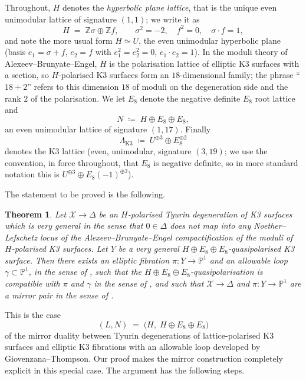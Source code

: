 \documentclass[11pt]{article}
\newtheorem{theorem}{Theorem}[section]
\newcommand{\X}{\mathcal{X}}
\newcommand{\D}{\Delta}
\newcommand{\PP}{\mathbb{P}}
\newcommand{\bZ}{\mathbb{Z}}
\begin{document}
Throughout, $H$ denotes the \emph{hyperbolic plane lattice}, that is the
unique even unimodular lattice of signature $(1,1)$; we write it as
\[
H \;=\; \bZ\sigma \oplus \bZ f,\qquad
\sigma^2 = -2,\quad f^2=0,\quad \sigma\cdot f = 1,
\]
and note the more usual form $H\simeq U$, the even unimodular hyperbolic
plane (basis $e_1 = \sigma+f$, $e_2 = f$ with $e_1^2=e_2^2=0$,
$e_1\cdot e_2 = 1$). In the moduli theory of Alexeev--Brunyate--Engel, $H$
is the polarisation lattice of elliptic K3 surfaces with a section, so
$H$-polarised K3 surfaces form an $18$-dimensional family; the phrase
``$18+2$'' refers to this dimension $18$ of moduli on the degeneration side
and the rank $2$ of the polarisation. We let $E_8$ denote the negative
definite $E_8$ root lattice and
\[
N \;\coloneqq\; H \oplus E_8 \oplus E_8,
\]
an even unimodular lattice of signature $(1,17)$. Finally
\[
\Lambda_{\mathrm{K3}} \;\coloneqq\; U^{\oplus 3}\oplus E_8^{\oplus 2}
\]
denotes the K3 lattice (even, unimodular, signature $(3,19)$; we use the
convention, in force throughout, that $E_8$ is negative definite, so in
more standard notation this is
$U^{\oplus3}\oplus E_8(-1)^{\oplus2}$).

The statement to be proved is the following.

\begin{theorem}\label{thm:main}
Let $\X\to\D$ be an $H$-polarised Tyurin degeneration of K3 surfaces which is
very general in the sense that $0\in\D$ does not map into any
Noether--Lefschetz locus of the Alexeev--Brunyate--Engel compactification of
the moduli of $H$-polarised K3 surfaces. Let $Y$ be a very general $H\oplus
E_8\oplus E_8$-quasipolarised K3 surface. Then there exists an elliptic
fibration $\pi\colon Y\to\PP^1$ and an allowable loop
$\gamma\subset\PP^1$, in the sense of {\upshape[GT, Definition 4.11]}, such
that the $H\oplus E_8\oplus E_8$-quasipolarisation is compatible with $\pi$
and $\gamma$ in the sense of {\upshape[GT, Definition 4.21]}, and such that
$\X\to\D$ and $\pi\colon Y\to\PP^1$ are a mirror pair in the sense of
{\upshape[GT, Definition 5.1]}.
\end{theorem}

This is the case
\[
(L,N) \;=\; \bigl(H,\;H\oplus E_8\oplus E_8\bigr)
\]
of the mirror duality between Tyurin degenerations of lattice-polarised K3
surfaces and elliptic K3 fibrations with an allowable loop developed by
Giovenzana--Thompson. Our proof makes the mirror construction completely
explicit in this special case. The argument has the following steps.
\end{document}
